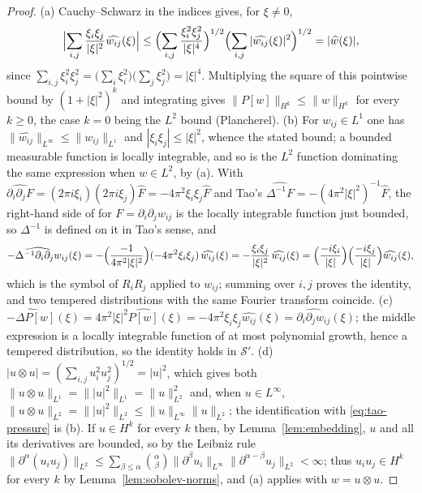 \documentclass[11pt]{article}
\theoremstyle{definition}
\theoremstyle{plain}
\newcommand{\norm}[1]{\lVert #1\rVert}
\begin{document}
\begin{proof}
(a) Cauchy--Schwarz in the indices gives, for $\xi\neq0$,
\[
 \Bigl|\sum_{i,j}\frac{\xi_i\xi_j}{|\xi|^2}\widehat{w_{ij}}(\xi)\Bigr|
 \leq\Bigl(\sum_{i,j}\frac{\xi_i^2\xi_j^2}{|\xi|^4}\Bigr)^{1/2}
 \Bigl(\sum_{i,j}|\widehat{w_{ij}}(\xi)|^2\Bigr)^{1/2}=|\widehat w(\xi)|,
\]
since $\sum_{i,j}\xi_i^2\xi_j^2=\bigl(\sum_i\xi_i^2\bigr)
\bigl(\sum_j\xi_j^2\bigr)=|\xi|^4$.  Multiplying the square of this
pointwise bound by $(1+|\xi|^2)^k$ and integrating gives
$\norm{P[w]}_{H^k}\leq\norm w_{H^k}$ for every $k\geq0$, the case $k=0$
being the $L^2$ bound (Plancherel).
(b) For $w_{ij}\in L^1$ one has $\norm{\widehat{w_{ij}}}_{L^\infty}\leq
\norm{w_{ij}}_{L^1}$ and $|\xi_i\xi_j|\leq|\xi|^2$, whence the stated bound;
a bounded measurable function is locally integrable, and so is the
$L^2$ function dominating the same expression when $w\in L^2$, by (a).  With
$\widehat{\partial_i\partial_jF}=(2\pi i\xi_i)(2\pi i\xi_j)\widehat F
=-4\pi^2\xi_i\xi_j\widehat F$ and Tao's
$\widehat{\Delta^{-1}F}=-(4\pi^2|\xi|^2)^{-1}\widehat F$, the right-hand
side of \cite[(14)]{Tao2013} for $F=\partial_i\partial_jw_{ij}$ is the
locally integrable function just bounded, so $\Delta^{-1}$ is defined on it
in Tao's sense, and
\[
 \widehat{-\Delta^{-1}\partial_i\partial_jw_{ij}}(\xi)
 =-\Bigl(\frac{-1}{4\pi^2|\xi|^2}\Bigr)(-4\pi^2\xi_i\xi_j)\,
 \widehat{w_{ij}}(\xi)
 =-\frac{\xi_i\xi_j}{|\xi|^2}\,\widehat{w_{ij}}(\xi)
 =\Bigl(\frac{-i\xi_i}{|\xi|}\Bigr)\Bigl(\frac{-i\xi_j}{|\xi|}\Bigr)
 \widehat{w_{ij}}(\xi),
\]
which is the symbol of $R_iR_j$ applied to $w_{ij}$; summing over $i,j$
proves the identity, and two tempered distributions with the same Fourier
transform coincide.
(c) $\widehat{-\Delta P[w]}(\xi)=4\pi^2|\xi|^2\widehat{P[w]}(\xi)
=-4\pi^2\xi_i\xi_j\widehat{w_{ij}}(\xi)
=\widehat{\partial_i\partial_jw_{ij}}(\xi)$; the middle expression is a
locally integrable function of at most polynomial growth, hence a tempered
distribution, so the identity holds in $\mathcal S'$.
(d) $|u\otimes u|=(\sum_{i,j}u_i^2u_j^2)^{1/2}=|u|^2$, which gives both
$\norm{u\otimes u}_{L^1}=\norm{|u|^2}_{L^1}=\norm u_{L^2}^2$ and, when
$u\in L^\infty$, $\norm{u\otimes u}_{L^2}=\norm{|u|^2}_{L^2}\leq
\norm u_{L^\infty}\norm u_{L^2}$; the identification with
\eqref{eq:tao-pressure} is (b).  If $u\in H^k$ for every $k$ then, by
Lemma~\ref{lem:embedding}, $u$ and all its derivatives are bounded, so by
the Leibniz rule $\norm{\partial^\alpha(u_iu_j)}_{L^2}\leq
\sum_{\beta\leq\alpha}\binom\alpha\beta
\norm{\partial^\beta u_i}_{L^\infty}
\norm{\partial^{\alpha-\beta}u_j}_{L^2}<\infty$; thus $u_iu_j\in H^k$ for
every $k$ by Lemma~\ref{lem:sobolev-norms}, and (a) applies with
$w=u\otimes u$.
\end{proof}
\end{document}
